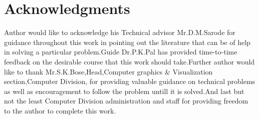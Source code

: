 \chapter*{Acknowledgments}
Author would like to acknowledge his Technical advisor Mr.D.M.Sarode for guidance throughout this work in pointing out the literature that can be of help in solving a particular problem.Guide Dr.P.K.Pal has provided time-to-time feedback on the desirable course that this work should take.Further author would like to thank Mr.S.K.Bose,Head,Computer graphics \& Visualization section,Computer Division, for providing valuable guidance on technical problems as well as encouragement to follow the problem untill it is solved.And last but not the least Computer Division administration and staff for providing freedom to the author to complete this work.
